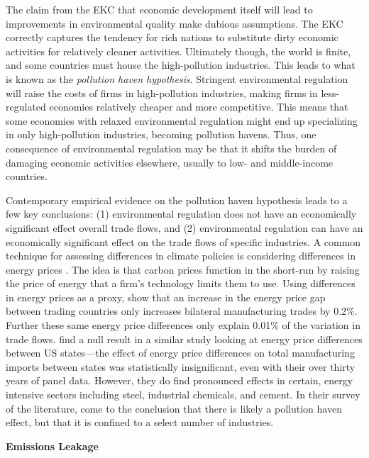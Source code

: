The claim from the EKC that economic development itself will lead to improvements in environmental quality make dubious assumptions. The EKC correctly captures the tendency for rich nations to substitute dirty economic activities for relatively cleaner activities. Ultimately though, the world is finite, and some countries must house the high-pollution industries. This leads to what is known as the \emph{pollution haven hypothesis}. Stringent environmental regulation will raise the costs of firms in high-pollution industries, making firms in less-regulated economies relatively cheaper and more competitive. This means that some economies with relaxed environmental regulation might end up specializing in only high-pollution industries, becoming pollution havens. Thus, one consequence of environmental regulation may be that it shifts the burden of damaging economic activities elsewhere, usually to low- and middle-income countries. 

Contemporary empirical evidence on the pollution haven hypothesis leads to a few key conclusions: (1) environmental regulation does not have an economically significant effect overall trade flows, and (2) environmental regulation can have an economically significant effect on the trade flows of specific industries. A common technique for assessing differences in climate policies is considering differences in energy prices \citep[see for example][]{fowlie2022mitigating}. The idea is that carbon prices function in the short-run by raising the price of energy that a firm's technology limits them to use. Using differences in energy prices as a proxy, \cite{sato2015asymmetric} show that an increase in the energy price gap between trading countries only increases bilateral manufacturing trades by 0.2\%. Further these same energy price differences only explain 0.01\% of the variation in trade flows. \cite{aldy2015competitiveness} find a null result in a similar study looking at energy price differences between US states---the effect of energy price differences on total manufacturing imports between states was statistically insignificant, even with their over thirty years of panel data. However, they do find pronounced effects in certain, energy intensive sectors including steel, industrial chemicals, and cement. In their survey of the literature, \cite{dechezlepretre2020impacts} come to the conclusion that there is likely a pollution haven effect, but that it is confined to a select number of industries.

\textbf{Emissions Leakage}

